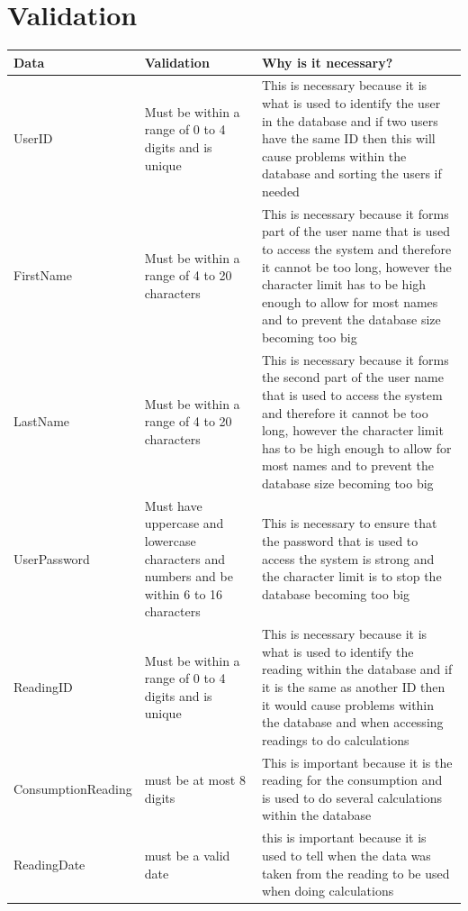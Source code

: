 \section{Validation}
\begin{center}
    \begin{tabular}{|p{3cm}|p{5cm}|p{5cm}|}
        \hline
        \textbf{Data} & \textbf{Validation} & \textbf{Why is it necessary?}\\ \hline
        UserID & Must be within a range of 0 to 4 digits and is unique & This is necessary because it is what is used to identify the user in the database and if two users have the same ID then this will cause problems within the database and sorting the users if needed \\ \hline
        FirstName & Must be within a range of 4 to 20 characters & This is necessary because it forms part of the user name that is used to access the system and therefore it cannot be too long, however the character limit has to be high enough to allow for most names and to prevent the database size becoming too big \\ \hline
        LastName & Must be within a range of 4 to 20 characters &This is necessary because it forms the second part of the user name that is used to access the system and therefore it cannot be too long, however the character limit has to be high enough to allow for most names and to prevent the database size becoming too big \\ \hline
        UserPassword & Must have uppercase and lowercase characters and numbers and be within 6 to 16 characters & This is necessary to ensure that the password that is used to access the system is strong and the character limit is to stop the database becoming too big \\ \hline
        ReadingID & Must be within a range of 0 to 4 digits and is unique & This is necessary because it is what is used to identify the reading within the database and if it is the same as another ID then it would cause problems within the database and when accessing readings to do calculations \\ \hline
        ConsumptionReading &  must be at most 8 digits & This is important because it is the reading for the consumption and is used to do several calculations within the database \\ \hline
        ReadingDate & must be a valid date & this is important because it is used to tell when the data was taken from the reading to be used when doing calculations \\ \hline

\end{tabular}
\end{center}
